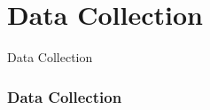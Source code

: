 \section{Data Collection}

\begin{frame}
     \begin{center}
     	\huge Data Collection
     \end{center}
\end{frame}

\begin{frame}
\frametitle{Data Collection}
\end{frame}